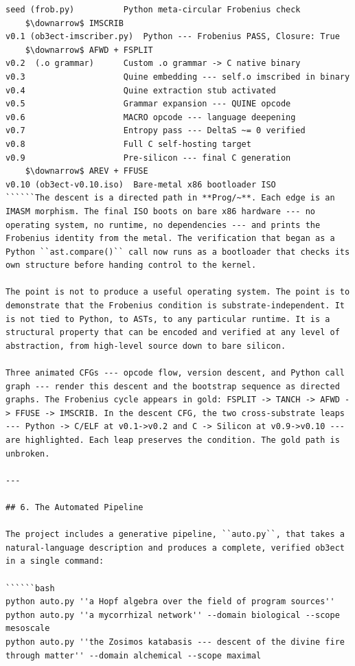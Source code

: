 \documentclass[12pt,a4paper]{article}
\begin{document}
\begin{lstlisting}
seed (frob.py)          Python meta-circular Frobenius check
    $\downarrow$ IMSCRIB
v0.1 (ob3ect-imscriber.py)  Python --- Frobenius PASS, Closure: True
    $\downarrow$ AFWD + FSPLIT
v0.2  (.o grammar)      Custom .o grammar -> C native binary
v0.3                    Quine embedding --- self.o imscribed in binary
v0.4                    Quine extraction stub activated
v0.5                    Grammar expansion --- QUINE opcode
v0.6                    MACRO opcode --- language deepening
v0.7                    Entropy pass --- DeltaS ~= 0 verified
v0.8                    Full C self-hosting target
v0.9                    Pre-silicon --- final C generation
    $\downarrow$ AREV + FFUSE
v0.10 (ob3ect-v0.10.iso)  Bare-metal x86 bootloader ISO
``````The descent is a directed path in **Prog/~**. Each edge is an IMASM morphism. The final ISO boots on bare x86 hardware --- no operating system, no runtime, no dependencies --- and prints the Frobenius identity from the metal. The verification that began as a Python ``ast.compare()`` call now runs as a bootloader that checks its own structure before handing control to the kernel.

The point is not to produce a useful operating system. The point is to demonstrate that the Frobenius condition is substrate-independent. It is not tied to Python, to ASTs, to any particular runtime. It is a structural property that can be encoded and verified at any level of abstraction, from high-level source down to bare silicon.

Three animated CFGs --- opcode flow, version descent, and Python call graph --- render this descent and the bootstrap sequence as directed graphs. The Frobenius cycle appears in gold: FSPLIT -> TANCH -> AFWD -> FFUSE -> IMSCRIB. In the descent CFG, the two cross-substrate leaps --- Python -> C/ELF at v0.1->v0.2 and C -> Silicon at v0.9->v0.10 --- are highlighted. Each leap preserves the condition. The gold path is unbroken.

---

## 6. The Automated Pipeline

The project includes a generative pipeline, ``auto.py``, that takes a natural-language description and produces a complete, verified ob3ect in a single command:

``````bash
python auto.py ''a Hopf algebra over the field of program sources''
python auto.py ''a mycorrhizal network'' --domain biological --scope mesoscale
python auto.py ''the Zosimos katabasis --- descent of the divine fire through matter'' --domain alchemical --scope maximal
\end{lstlisting}
\end{document}
